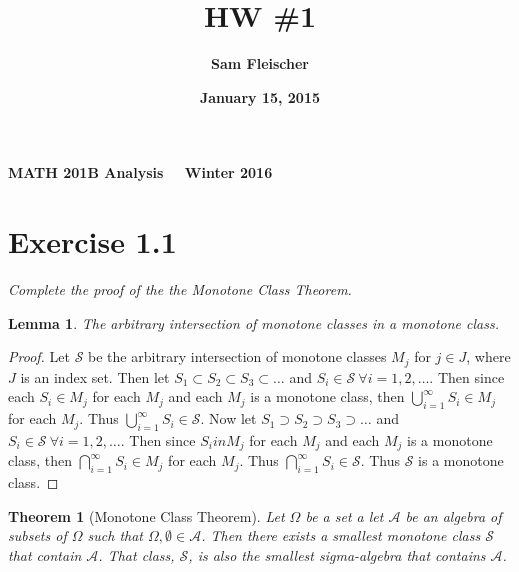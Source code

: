 \documentclass[12pt]{article}
\title{\bf HW \#1}
\author{\bf Sam Fleischer}
\date{\bf January 15, 2015}
\theoremstyle{plain}
\newtheorem{theorem}{Theorem}
\newtheorem{lemma}{Lemma}
\begin{document}
\textbf{MATH 201B \hfill Analysis \ \ \hfill Winter 2016\ \ \ }

{\let\newpage\relax\maketitle}

\section*{Exercise 1.1}
\textit{Complete the proof of the the Monotone Class Theorem.}

\begin{lemma}
    \label{monotone_class_lemma}
    The arbitrary intersection of monotone classes in a monotone class.
\end{lemma}
\begin{proof}
    Let $\mathcal{S}$ be the arbitrary intersection of monotone classes $M_j$ for $j \in J$, where $J$ is an index set.  Then let $S_1 \subset S_2 \subset S_3 \subset \dots$ and $S_i \in \mathcal{S}\ \forall i = 1, 2, \dots$.  Then since each $S_i \in M_j$ for each $M_j$ and each $M_j$ is a monotone class, then $\bigcup_{i=1}^\infty S_i \in M_j$ for each $M_j$.  Thus $\bigcup_{i=1}^\infty S_i \in \mathcal{S}$.  Now let $S_1 \supset S_2 \supset S_3 \supset \dots$ and $S_i \in \mathcal{S}\ \forall i = 1, 2, \dots$.  Then since $S_i in M_j$ for each $M_j$ and each $M_j$ is a monotone class, then $\bigcap_{i=1}^\infty S_i \in M_j$ for each $M_j$.  Thus $\bigcap_{i=1}^\infty S_i \in \mathcal{S}$.  Thus $\mathcal{S}$ is a monotone class.
\end{proof}

\begin{theorem}[Monotone Class Theorem]
    Let $\Omega$ be a set a let $\mathcal{A}$ be an algebra of subsets of $\Omega$ such that $\Omega, \emptyset \in \mathcal{A}$.  Then there exists a smallest monotone class $\mathcal{S}$ that contain $\mathcal{A}$.  That class, $\mathcal{S}$, is also the smallest sigma-algebra that contains $\mathcal{A}$.
\end{theorem}
\end{document}
